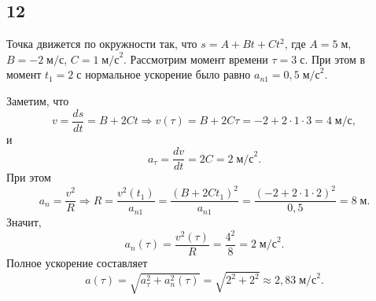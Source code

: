 \subsection{12}

Точка движется по окружности так, что $s=A+Bt+Ct^2$, где $A=5\;\text{м}$, $B=-2\;\text{м/с}$, $C=1\;\text{м/с}^2$. Рассмотрим момент времени $\tau=3\;\text{с}$. При этом в момент $t_1=2\;\text{с}$ нормальное ускорение было равно $a_{n1}=0{,}5\;\text{м/с}^2$.

Заметим, что
\[
v=\frac{ds}{dt}=B+2Ct\Rightarrow v(\tau)=B+2C\tau=-2+2\cdot1\cdot3=4\;\text{м/с},
\]
и
\[
a_\tau=\frac{dv}{dt}=2C=2\;\text{м/с}^2.
\]
При этом
\[
a_n=\frac{v^2}{R}\Rightarrow R=\frac{v^2(t_1)}{a_{n1}}=\frac{(B+2Ct_1)^2}{a_{n1}}=\frac{(-2+2\cdot1\cdot2)^2}{0{,}5}=8\;\text{м}.
\]
Значит,
\[
a_n(\tau)=\frac{v^2(\tau)}{R}=\frac{4^2}{8}=2\;\text{м/с}^2.
\]
Полное ускорение составляет
\[
a(\tau)=\sqrt{a_\tau^2+a^2_n(\tau)}=\sqrt{2^2+2^2}\approx2{,}83\;\text{м/с}^2.
\]
